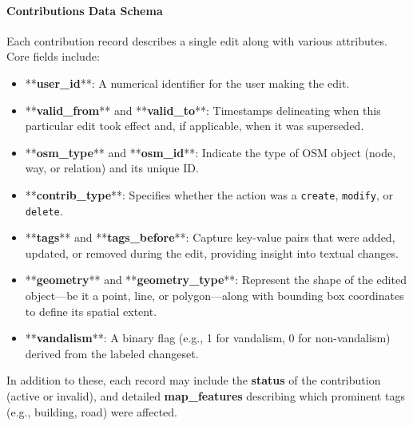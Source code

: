 \documentclass[
    13pt, %
    a4paper, %
    twoside, 
    DIV14, %
    listof=totoc, %
    bibliography=totoc, %
    index=totoc, %
    headsepline
]{scrreprt}
\begin{document}
\paragraph{Contributions Data Schema}
Each contribution record describes a single edit along with various attributes. Core fields include:
\begin{itemize}
    \item **\textbf{user\_id}**: A numerical identifier for the user making the edit.  
    \item **\textbf{valid\_from}** and **\textbf{valid\_to}**: Timestamps delineating when this particular edit took effect and, if applicable, when it was superseded.  
    \item **\textbf{osm\_type}** and **\textbf{osm\_id}**: Indicate the type of OSM object (node, way, or relation) and its unique ID.  
    \item **\textbf{contrib\_type}**: Specifies whether the action was a \texttt{create}, \texttt{modify}, or \texttt{delete}.  
    \item **\textbf{tags}** and **\textbf{tags\_before}**: Capture key-value pairs that were added, updated, or removed during the edit, providing insight into textual changes.  
    \item **\textbf{geometry}** and **\textbf{geometry\_type}**: Represent the shape of the edited object—be it a point, line, or polygon—along with bounding box coordinates to define its spatial extent.  
    \item **\textbf{vandalism}**: A binary flag (e.g., 1 for vandalism, 0 for non-vandalism) derived from the labeled changeset. 
\end{itemize}

\noindent
In addition to these, each record may include the \textbf{status} of the contribution (active or invalid), and detailed \textbf{map\_features} describing which prominent tags (e.g., building, road) were affected.
\end{document}
